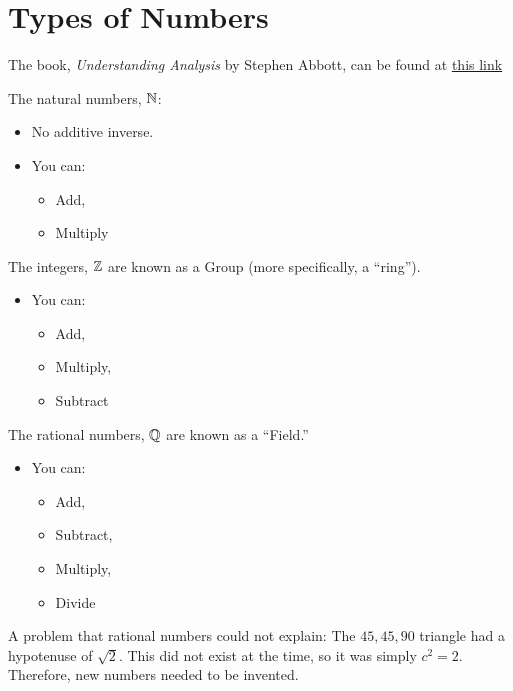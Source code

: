 \section{Types of Numbers}

The book, \textit{Understanding Analysis} by Stephen Abbott, can be found at \href{file:///C:/Users/paulb/OneDrive%20-%20Hendrix%20College/0.3%20Junior%20Year/Real%20Analysis%20(MATH%20350%2001)/2015_Book_UnderstandingAnalysis.pdf}{this link}

The \gls{natural numbers}, \(\mathbb{N}\):
\begin{itemize}
    \item No additive inverse.
    \item You can:
    \begin{itemize}
        \item Add,
        \item Multiply
    \end{itemize}
\end{itemize}

The \gls{integers}, \(\mathbb{Z}\) are known as a Group (more specifically, a ``ring'').

\begin{itemize}
    \item You can:
    \begin{itemize}
        \item Add,
        \item Multiply,
        \item Subtract
    \end{itemize}
\end{itemize}

The \gls{rational numbers}, \(\mathbb{Q}\) are known as a ``Field.''

\begin{itemize}
    \item You can:
    \begin{itemize}
        \item Add,
        \item Subtract,
        \item Multiply,
        \item Divide
    \end{itemize}
\end{itemize}

A problem that rational numbers could not explain: The \(45, 45, 90\) triangle had a hypotenuse of \(\sqrt{2}\). This did not exist at the time, so it was simply \(c^2 = 2\). Therefore, new numbers needed to be invented.

